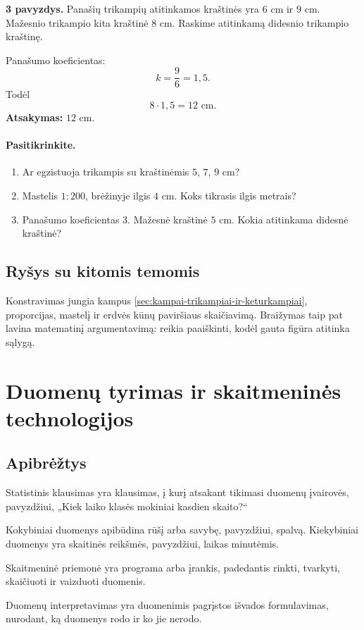 \textbf{3 pavyzdys.} Panašių trikampių atitinkamos kraštinės yra \(6\) cm ir \(9\) cm. Mažesnio trikampio kita kraštinė \(8\) cm. Raskime atitinkamą didesnio trikampio kraštinę.

Panašumo koeficientas:
\[
k=\frac{9}{6}=1,5.
\]
Todėl
\[
8\cdot 1,5=12\text{ cm}.
\]
\textbf{Atsakymas:} \(12\) cm.

\paragraph{Pasitikrinkite.}
\begin{enumerate}[label=\arabic*.]
\item Ar egzistuoja trikampis su kraštinėmis \(5\), \(7\), \(9\) cm?
\item Mastelis \(1:200\), brėžinyje ilgis \(4\) cm. Koks tikrasis ilgis metrais?
\item Panašumo koeficientas \(3\). Mažesnė kraštinė \(5\) cm. Kokia atitinkama didesnė kraštinė?
\end{enumerate}

\subsection{Ryšys su kitomis temomis}
Konstravimas jungia kampus \ref{sec:kampai-trikampiai-ir-keturkampiai}, proporcijas, mastelį ir erdvės kūnų paviršiaus skaičiavimą. Braižymas taip pat lavina matematinį argumentavimą: reikia paaiškinti, kodėl gauta figūra atitinka sąlygą.

\section{Duomenų tyrimas ir skaitmeninės technologijos}\label{sec:duomenu-tyrimas-ir-skaitmenines-technologijos}

\subsection{Apibrėžtys}
\begin{apibreztis}
Statistinis klausimas yra klausimas, į kurį atsakant tikimasi duomenų įvairovės, pavyzdžiui, „Kiek laiko klasės mokiniai kasdien skaito?“
\end{apibreztis}
\begin{apibreztis}
Kokybiniai duomenys apibūdina rūšį arba savybę, pavyzdžiui, spalvą. Kiekybiniai duomenys yra skaitinės reikšmės, pavyzdžiui, laikas minutėmis.
\end{apibreztis}
\begin{apibreztis}
Skaitmeninė priemonė yra programa arba įrankis, padedantis rinkti, tvarkyti, skaičiuoti ir vaizduoti duomenis.
\end{apibreztis}
\begin{apibreztis}
Duomenų interpretavimas yra duomenimis pagrįstos išvados formulavimas, nurodant, ką duomenys rodo ir ko jie nerodo.
\end{apibreztis}

